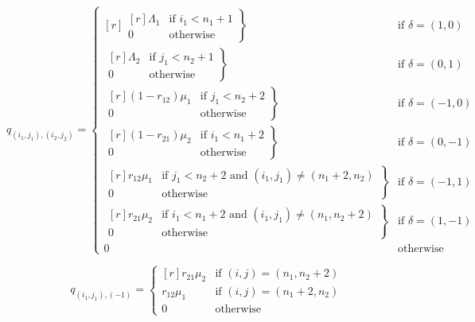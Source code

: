 \documentclass{article}
\numberwithin{equation}{section}
\begin{document}
\begin{equation}
  q_{(i_1, j_1),(i_2, j_2)} = \left\{
  \begin{matrix*}[ r ]
    \left. \begin{matrix*}[ r ]
      \Lambda_1 & \text{if } i_1 < n_1 + 1 \\
      0 & \text{otherwise}
    \end{matrix*} \right\} & \text{if } \delta = (1, 0) \\
    \left. \begin{matrix*}[ r ]
      \Lambda_2 & \text{if } j_1 < n_2 + 1 \\
      0 & \text{otherwise}
    \end{matrix*} \right\} & \text{if } \delta = (0, 1) \\
    \left. \begin{matrix*}[ r ]
      (1 - r_{12})\mu_1 & \text{if } j_1 < n_2 + 2 \\
      0 & \text{otherwise}
    \end{matrix*} \right\} & \text{if } \delta = (-1, 0) \\
    \left. \begin{matrix*}[ r ]
      (1 - r_{21})\mu_2 & \text{if } i_1 < n_1 + 2 \\
      0 & \text{otherwise}
    \end{matrix*} \right\} & \text{if } \delta = (0, -1) \\
    \left. \begin{matrix*}[ r ]
      r_{12}\mu_1 & \text{if } j_1 < n_2 + 2 \text{ and } (i_1, j_1) \neq (n_1 + 2, n_2) \\
      0 & \text{otherwise}
    \end{matrix*} \right\} & \text{if } \delta = (-1, 1) \\
    \left. \begin{matrix*}[ r ]
      r_{21}\mu_2 & \text{if } i_1 < n_1 + 2 \text{ and } (i_1, j_1) \neq (n_1, n_2 + 2) \\
      0 & \text{otherwise}
    \end{matrix*} \right\} & \text{if } \delta = (1, -1) \\
    0 & \text{otherwise}
  \end{matrix*} \right.
\end{equation}

\begin{equation}
  q_{(i_1, j_1), (-1)} = \left\{
  \begin{matrix*}[ r ]
    r_{21}\mu_2 & \text{if } (i, j) = (n_1, n_2 + 2) \\
    r_{12}\mu_1 & \text{if } (i, j) = (n_1 + 2, n_2) \\
    0 & \text{otherwise}
  \end{matrix*}
  \right.
\end{equation}
\end{document}
